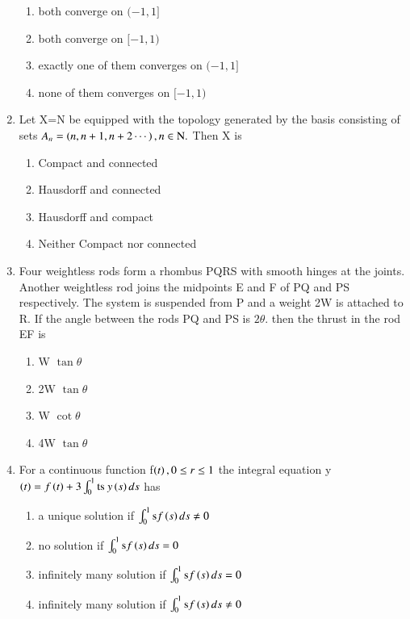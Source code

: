 \documentclass[journal]{IEEEtran}
\begin{document}
\begin{enumerate}[start=40]
    \begin{enumerate}
        \item both converge on $(-1,1]$
        \item both converge on $[-1,1)$
        \item exactly one of them converges on $(-1,1]$
        \item none of them converges on $[-1,1)$
    \end{enumerate}
\bigskip 
\item Let X=N be equipped with the topology generated by the basis consisting of sets $A_{n}=\left(n,n+1,n+2\cdots\right),n\in \text{N}.$ Then X is 
\begin{multicols}{2}
    \begin{enumerate}
        \item Compact and connected 
        \item Hausdorff and connected 
        \item Hausdorff and compact
        \item Neither Compact nor connected
    \end{enumerate}
\end{multicols}
\bigskip
\item Four weightless rods form a rhombus PQRS with smooth hinges at the joints. Another weightless rod joins the midpoints E and F of PQ and PS respectively. The system is suspended from P and a weight 2W is attached to R. If the angle between the rods PQ and PS is $2\theta$. then the thrust in the rod EF is
\begin{multicols}{4}
    \begin{enumerate}
        \item W $\tan\theta$
        \item 2W $\tan\theta$
        \item W $\cot\theta$
        \item 4W $\tan\theta$
    \end{enumerate}
\end{multicols}
\bigskip
\item For a continuous  function f$\left(t\right),0\leq r \leq 1$ the integral equation y$\left(t\right)=f\left(t\right)+3\int_{0}^{1} \text{ts }  y\left(s\right)ds$ has 

    \begin{enumerate}
        \item a unique solution if $\int_{0}^{1} \text{s}f\left(s\right)ds \neq 0$
        \item no  solution if $\int_{0}^{1} \text{s}f\left(s\right)ds=0$
        \item  infinitely many solution if $\int_{0}^{1} \text{s}f\left(s\right)ds=0$
        \item infinitely many solution if $\int_{0}^{1} \text{s}f\left(s\right)ds \neq 0$
    \end{enumerate}


\end{enumerate}
\end{document}
